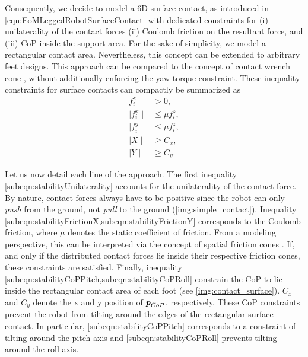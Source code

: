 Consequently, we decide to model a 6D surface contact, as introduced in \ref{eqn:EoMLeggedRobotSurfaceContact} with dedicated constraints for (i) unilaterality of the contact forces (ii) Coulomb friction on the resultant force, and (iii) \gls{CoP} inside the support area. For the sake of simplicity, we model a rectangular contact area. Nevertheless, this concept can be extended  to arbitrary feet designs. This approach can be compared to the concept of contact wrench cone \cite{caron2015stability}, without additionally enforcing the yaw torque constraint. These inequality constraints for surface contacts can compactly be summarized as
\begin{subequations}\label{eqn:contractWrenchConeReduced}
\begin{align}
f_i^z &> 0 \label{subeqn:stabilityUnilaterality},\\
\mid f_i^x\mid &\leq \mu f_i^z \label{subeqn:stabilityFrictionX},\\
\mid f_i^y\mid &\leq \mu f_i^z \label{subeqn:stabilityFrictionY},\\
\mid X\mid & \geq C_x \label{subeqn:stabilityCoPPitch},\\
\mid Y\mid & \geq C_y \label{subeqn:stabilityCoPRoll}.
\end{align}
\end{subequations}

Let us now detail each line of the approach. 
The first inequality \cref{subeqn:stabilityUnilaterality} accounts for the unilaterality of the contact force. By nature, contact forces always have to be positive since the robot can only \textit{push} from the ground, not \textit{pull} to the ground (\cref{img:simple_contact}). 
Inequality \cref{subeqn:stabilityFrictionX,subeqn:stabilityFrictionY} corresponds to the Coulomb friction, where $\mu$ denotes the static coefficient of friction. From a modeling perspective, this can be interpreted via the concept of spatial friction cones \cite{kao2016contact}. If, and only if the distributed contact forces lie inside their respective friction cones, these constraints are satisfied. 
Finally, inequality \cref{subeqn:stabilityCoPPitch,subeqn:stabilityCoPRoll} constrain the \gls{CoP} to lie inside the rectangular contact area of each foot (see \cref{img:contact_surface}). $C_x$ and $C_y$ denote the x and y position of $\bm{\mathit{p}}_{CoP}$, respectively. These \gls{CoP} constraints prevent the robot from tilting around the edges of the rectangular surface contact. In particular, \cref{subeqn:stabilityCoPPitch} corresponds to a constraint of tilting around the pitch axis and \cref{subeqn:stabilityCoPRoll} prevents tilting around the roll axis.

